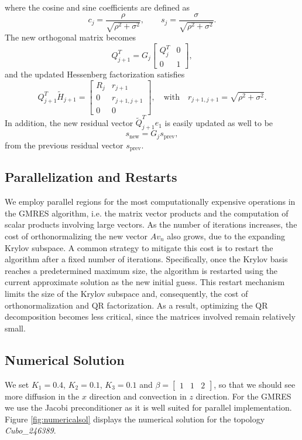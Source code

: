 \documentclass[hidelinks]{article}
\begin{document}
where the cosine and sine coefficients are defined as
\[
c_j = \frac{\rho}{\sqrt{\rho^2 + \sigma^2}}, \qquad
s_j = \frac{\sigma}{\sqrt{\rho^2 + \sigma^2}}.
\]
The new orthogonal matrix becomes
\[
Q^T_{j+1} = G_j 
\begin{bmatrix}
Q^T_j & 0 \\
0 & 1
\end{bmatrix},
\]
and the updated Hessenberg factorization satisfies
\[
Q^T_{j+1} \widetilde{H}_{j+1} =
\begin{bmatrix}
R_j & r_{j+1} \\
0 & r_{j+1,j+1} \\
0 & 0
\end{bmatrix},
\quad \text{with} \quad
r_{j+1,j+1} = \sqrt{\rho^2 + \sigma^2}.
\]
In addition, the new residual vector $\widetilde{Q}^T_{j+1}e_1$ is easily updated as well to be
\[
s_\text{new} = G_j s_\text{prev},
\]
from the previous residual vector $s_\text{prev}$.

\subsection{Parallelization and Restarts}

We employ parallel regions for the most computationally expensive operations in the GMRES algorithm, i.e. the matrix vector products and the computation of scalar products involving large vectors. As the number of iterations increases, the cost of orthonormalizing the new vector $Av_n$ also grows, due to the expanding Krylov subspace.
A common strategy to mitigate this cost is to restart the algorithm after a fixed number of iterations. Specifically, once the Krylov basis reaches a predetermined maximum size, the algorithm is restarted using the current approximate solution as the new initial guess. This restart mechanism limits the size of the Krylov subspace and, consequently, the cost of orthonormalization and QR factorization. As a result, optimizing the QR decomposition becomes less critical, since the matrices involved remain relatively small.

\subsection{Numerical Solution}
We set $K_1 = 0.4$, $K_2 = 0.1$, $K_3 = 0.1$ and $\beta = \begin{bmatrix} 1 &1& 2 \end{bmatrix}$, so that we should see more diffusion in the $x$ direction and convection in $z$ direction. For the GMRES we use the Jacobi preconditioner as it is well suited for parallel implementation. Figure \ref{fig:numericalsol} displays the numerical solution for the topology \emph{Cubo\_246389}.
\end{document}

